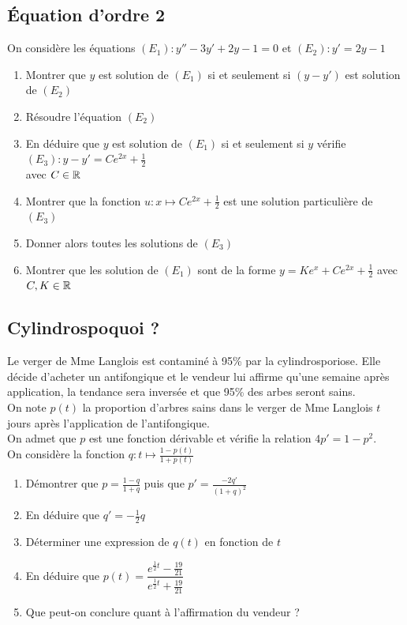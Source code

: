 \documentclass[oneside,12pt]{book}          %
\begin{document}
\subsection{Équation d'ordre 2}
On considère les équations $(E_1):y''-3y'+2y-1=0$ et $(E_2):y'=2y-1$
\begin{enumerate}
	\item Montrer que $y$ est solution de $(E_1)$ si et seulement si $(y-y')$ est solution de $(E_2)$
	\item Résoudre l'équation $(E_2)$
	\item En déduire que $y$ est solution de $(E_1)$ si et seulement si $y$ vérifie $(E_3):y-y'=Ce^{2x}+\frac{1}{2}$ \\avec $C\in{\mathbb R}$
	\item Montrer que la fonction $u:x\mapsto Ce^{2x}+\frac{1}{2}$ est une solution particulière de $(E_3)$
	\item Donner alors toutes les solutions de $(E_3)$
	\item Montrer que les solution de $(E_1)$ sont de la forme $y=Ke^x+Ce^{2x}+\frac{1}{2}$ \quad avec $C,K\in{\mathbb R}$
\end{enumerate}




\subsection{Cylindrospoquoi ?}
Le verger de Mme Langlois est contaminé à 95\% par la cylindrosporiose. Elle décide d'acheter un antifongique et le vendeur lui affirme qu'une semaine après application, la tendance sera inversée et que 95\% des arbes seront sains.\\[5pt]
On note $p(t)$ la proportion d'arbres sains dans le verger de Mme Langlois $t$ jours après l'application de l'antifongique.\\[5pt]
On admet que $p$ est une fonction dérivable et vérifie la relation $4p'=1-p^2$.\\[5pt]
On considère la fonction $q:t\mapsto \frac{1-p(t)}{1+p(t)}$

\begin{enumerate}
    \item Démontrer que $p=\frac{1-q}{1+q}$ puis que $p'=\frac{-2q'}{(1+q)^2}$
    \item En déduire que $q'=-\frac{1}{2}q$
    \item Déterminer une expression de $q(t)$ en fonction de $t$
    \item En déduire que $p(t)=\dfrac{e^{\frac{1}{2}t}-\frac{19}{21}}{e^{\frac{1}{2}t}+\frac{19}{21}}$
    \item Que peut-on conclure quant à l'affirmation du vendeur ?
\end{enumerate}
\end{document}
